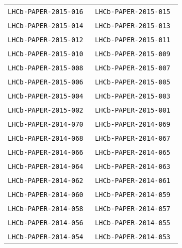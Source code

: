 \begin{center}
\begin{longtable}{ll}
\texttt{LHCb-PAPER-2015-016}~\cite{LHCb-PAPER-2015-016} &
\texttt{LHCb-PAPER-2015-015}~\cite{LHCb-PAPER-2015-015} \\
\texttt{LHCb-PAPER-2015-014}~\cite{LHCb-PAPER-2015-014} &
\texttt{LHCb-PAPER-2015-013}~\cite{LHCb-PAPER-2015-013} \\
\texttt{LHCb-PAPER-2015-012}~\cite{LHCb-PAPER-2015-012} &
\texttt{LHCb-PAPER-2015-011}~\cite{LHCb-PAPER-2015-011} \\
\texttt{LHCb-PAPER-2015-010}~\cite{LHCb-PAPER-2015-010} &
\texttt{LHCb-PAPER-2015-009}~\cite{LHCb-PAPER-2015-009} \\
\texttt{LHCb-PAPER-2015-008}~\cite{LHCb-PAPER-2015-008} &
\texttt{LHCb-PAPER-2015-007}~\cite{LHCb-PAPER-2015-007} \\
\texttt{LHCb-PAPER-2015-006}~\cite{LHCb-PAPER-2015-006} &
\texttt{LHCb-PAPER-2015-005}~\cite{LHCb-PAPER-2015-005} \\
\texttt{LHCb-PAPER-2015-004}~\cite{LHCb-PAPER-2015-004} &
\texttt{LHCb-PAPER-2015-003}~\cite{LHCb-PAPER-2015-003} \\
\texttt{LHCb-PAPER-2015-002}~\cite{LHCb-PAPER-2015-002} &
\texttt{LHCb-PAPER-2015-001}~\cite{LHCb-PAPER-2015-001} \\
\hline
\texttt{LHCb-PAPER-2014-070}~\cite{LHCb-PAPER-2014-070} &
\texttt{LHCb-PAPER-2014-069}~\cite{LHCb-PAPER-2014-069} \\
\texttt{LHCb-PAPER-2014-068}~\cite{LHCb-PAPER-2014-068} &
\texttt{LHCb-PAPER-2014-067}~\cite{LHCb-PAPER-2014-067} \\
\texttt{LHCb-PAPER-2014-066}~\cite{LHCb-PAPER-2014-066} &
\texttt{LHCb-PAPER-2014-065}~\cite{LHCb-PAPER-2014-065} \\
\texttt{LHCb-PAPER-2014-064}~\cite{LHCb-PAPER-2014-064} &
\texttt{LHCb-PAPER-2014-063}~\cite{LHCb-PAPER-2014-063} \\
\texttt{LHCb-PAPER-2014-062}~\cite{LHCb-PAPER-2014-062} &
\texttt{LHCb-PAPER-2014-061}~\cite{LHCb-PAPER-2014-061} \\
\texttt{LHCb-PAPER-2014-060}~\cite{LHCb-PAPER-2014-060} &
\texttt{LHCb-PAPER-2014-059}~\cite{LHCb-PAPER-2014-059} \\
\texttt{LHCb-PAPER-2014-058}~\cite{LHCb-PAPER-2014-058} &
\texttt{LHCb-PAPER-2014-057}~\cite{LHCb-PAPER-2014-057} \\
\texttt{LHCb-PAPER-2014-056}~\cite{LHCb-PAPER-2014-056} &
\texttt{LHCb-PAPER-2014-055}~\cite{LHCb-PAPER-2014-055} \\
\texttt{LHCb-PAPER-2014-054}~\cite{LHCb-PAPER-2014-054} &
\texttt{LHCb-PAPER-2014-053}~\cite{LHCb-PAPER-2014-053} \\

\end{longtable}
\end{center}
